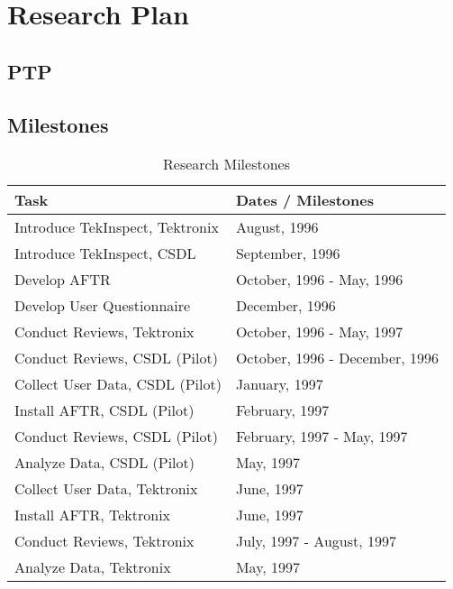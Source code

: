 
\section{Research Plan}
\label{sec:plan}

\subsection{PTP}

\subsection{Milestones}
\begin{table}
  \caption{Research Milestones}
  
  \begin{center}
    \begin{tabular}{|l|l|}\hline
      {\bf Task}&{\bf Dates / Milestones}\\ \hline \hline
      Introduce TekInspect, Tektronix&August, 1996\\ \hline
      Introduce TekInspect, CSDL& September, 1996\\ \hline
      Develop AFTR& October, 1996 - May, 1996\\ \hline
      Develop User Questionnaire& December, 1996\\ \hline
      Conduct Reviews, Tektronix& October, 1996 - May, 1997\\ \hline \hline
      Conduct Reviews, CSDL (Pilot)& October, 1996 - December, 1996\\ \hline
      Collect User Data, CSDL (Pilot)& January, 1997\\ \hline
      Install AFTR, CSDL (Pilot)& February, 1997\\ \hline
      Conduct Reviews, CSDL (Pilot)& February, 1997 - May, 1997\\ \hline
      Analyze Data, CSDL (Pilot)& May, 1997\\ \hline \hline
      Collect User Data, Tektronix& June, 1997\\ \hline
      Install AFTR, Tektronix& June, 1997\\ \hline
      Conduct Reviews, Tektronix& July, 1997 - August, 1997\\ \hline
      Analyze Data, Tektronix& May, 1997\\ \hline
    \end{tabular}
  \end{center}
\end{table}
